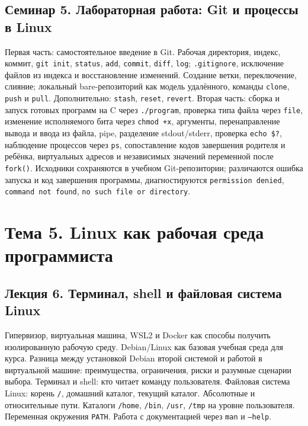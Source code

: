 \documentclass[a4paper,14pt]{extreport}
\begin{document}
\subsection*{Семинар 5. Лабораторная работа: Git и процессы в Linux}

Первая часть: самостоятельное введение в Git. Рабочая директория, индекс,
коммит, \texttt{git init}, \texttt{status}, \texttt{add}, \texttt{commit},
\texttt{diff}, \texttt{log}; \texttt{.gitignore}, исключение файлов из
индекса и восстановление изменений. Создание ветки, переключение,
слияние; локальный bare-репозиторий как модель удалённого, команды
\texttt{clone}, \texttt{push} и \texttt{pull}. Дополнительно:
\texttt{stash}, \texttt{reset}, \texttt{revert}. Вторая часть: сборка и
запуск готовых программ на C через \texttt{./program}, проверка типа файла
через \texttt{file}, изменение исполняемого бита через \texttt{chmod +x},
аргументы, перенаправление вывода и ввода из файла, pipe, разделение
stdout/stderr, проверка \texttt{echo \$?}, наблюдение процессов через
\texttt{ps}, сопоставление кодов завершения родителя и ребёнка,
виртуальных адресов и независимых значений переменной после \texttt{fork()}.
Исходники сохраняются в учебном Git-репозитории; различаются ошибка запуска
и код завершения программы, диагностируются \texttt{permission denied},
\texttt{command not found}, \texttt{no such file or directory}.

\section{Тема 5. Linux как рабочая среда программиста}

\subsection*{Лекция 6. Терминал, shell и файловая система Linux}

Гипервизор, виртуальная машина, WSL2 и Docker как способы получить изолированную рабочую среду. Debian/Linux как базовая учебная среда для курса. Разница между установкой Debian второй системой и работой в виртуальной машине: преимущества, ограничения, риски и разумные сценарии выбора. Терминал и shell: кто читает команду пользователя. Файловая система Linux: корень \texttt{/}, домашний каталог, текущий каталог. Абсолютные и относительные пути. Каталоги \texttt{/home}, \texttt{/bin}, \texttt{/usr}, \texttt{/tmp} на уровне пользователя. Переменная окружения \texttt{PATH}. Работа с документацией через \texttt{man} и \texttt{--help}.
\end{document}
